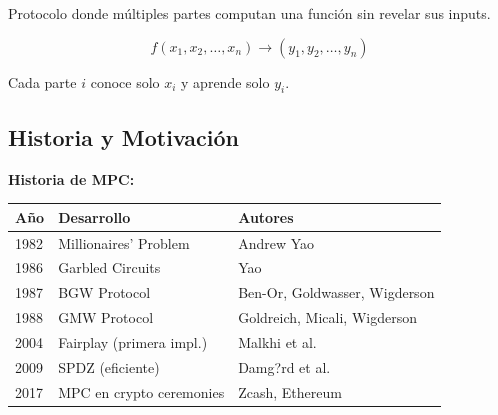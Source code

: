 \documentclass[11pt,a4paper,twoside]{book}
\begin{document}
\begin{definition}[MPC]
Protocolo donde m\'ultiples partes computan una funci\'on sin revelar sus inputs.
\end{definition}

\[
f(x_1, x_2, \ldots, x_n) \to (y_1, y_2, \ldots, y_n)
\]

Cada parte $i$ conoce solo $x_i$ y aprende solo $y_i$.

\subsection{Historia y Motivaci\'on}

\begin{remark}
\textbf{Historia de MPC:}

\begin{center}
\begin{tabular}{lll}
\toprule
\textbf{A\~no} & \textbf{Desarrollo} & \textbf{Autores} \\
\midrule
1982 & Millionaires' Problem & Andrew Yao \\
1986 & Garbled Circuits & Yao \\
1987 & BGW Protocol & Ben-Or, Goldwasser, Wigderson \\
1988 & GMW Protocol & Goldreich, Micali, Wigderson \\
2004 & Fairplay (primera impl.) & Malkhi et al. \\
2009 & SPDZ (eficiente) & Damg?rd et al. \\
2017 & MPC en crypto ceremonies & Zcash, Ethereum \\
\bottomrule
\end{tabular}
\end{center}
\end{remark}
\end{document}
